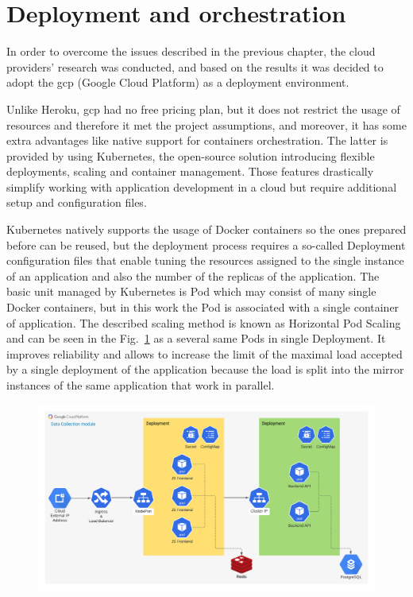 \section{Deployment and orchestration}\label{sec:deployment-and-orchestration}
In order to overcome the issues described in the previous chapter, the cloud providers' research was conducted, and based on the results it was decided to adopt the \gls{gcp} (Google Cloud Platform) as a deployment environment.

Unlike Heroku, \gls{gcp} had no free pricing plan, but it does not restrict the usage of resources and therefore it met the project assumptions, and moreover, it has some extra advantages like native support for containers orchestration.
The latter is provided by using Kubernetes, the open-source solution introducing flexible deployments, scaling and container management.
Those features drastically simplify working with application development in a cloud but require additional setup and configuration files.

Kubernetes natively supports the usage of Docker containers so the ones prepared before can be reused, but the deployment process requires a so-called Deployment configuration files that enable tuning the resources assigned to the single instance of an application and also the number of the replicas of the application.
The basic unit managed by Kubernetes is Pod which may consist of many single Docker containers, but in this work the Pod is associated with a single container of application.
The described scaling method is known as Horizontal Pod Scaling and can be seen in the Fig.~\ref{fig:gcp_diagram} as a several same Pods in single Deployment.
It improves reliability and allows to increase the limit of the maximal load accepted by a single deployment of the application because the load is split into the mirror instances of the same application that work in parallel.

\begin{figure}
    \includegraphics[width=\linewidth]{resources/gcp_diagram}
    \label{fig:gcp_diagram}
\end{figure}

